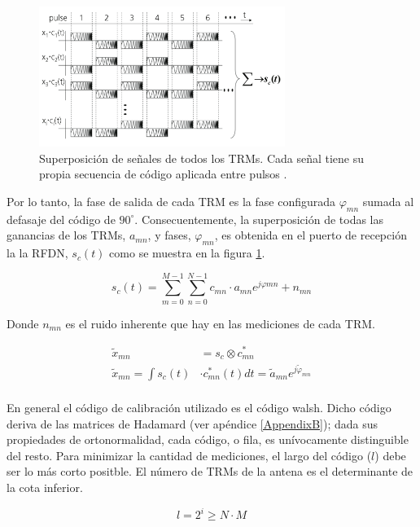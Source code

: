 \begin{figure}[!H]
 \centering
 \includegraphics[width=8cm]{gfx/superposition_signals_classic.png}
 \caption{Superposición de señales de todos los TRMs. Cada señal tiene su propia secuencia de código aplicada entre pulsos \cite{Br2007}.}
 \label{fig:sup_sign_classic}
\end{figure}

Por lo tanto, la fase de salida de cada TRM es la fase configurada $\varphi_{mn}$ sumada al defasaje del código de 
$90^{\circ}$. Consecuentemente, la superposición de todas las ganancias de los TRMs, $a_{mn}$, y fases, $\varphi_{mn}$,
es obtenida en el puerto de recepción la la RFDN, $s_c(t)$ como se muestra en la figura \ref{fig:sup_sign_classic}.

\begin{equation}
	s_c(t) = \sum_{m=0}^{M-1}\sum_{n=0}^{N-1}c_{mn}\cdot a_{mn}e^{j\varphi{mn}} + n_{mn}
\end{equation}

Donde $n_{mn}$ es el ruido inherente que hay en las mediciones de cada TRM.

\begin{equation}
\begin{aligned}
	\tilde{x}_{mn} &= s_c \otimes c^*_{mn} \\
	\tilde{x}_{mn} = \int s_c(t) &\cdot c^*_{mn}(t) dt = \tilde{a}_{mn}e^{j\tilde{\varphi}_{mn}} \\
\end{aligned}
\label{eq:con}
\end{equation}

En general el código de calibración utilizado es el código walsh. Dicho código deriva de las matrices de Hadamard (ver 
apéndice \ref{AppendixB}); dada sus propiedades de ortonormalidad, cada código, o fila, es unívocamente distinguible del 
resto. Para minimizar la cantidad de mediciones, el largo del código ($l$) debe ser lo más corto positble. El número de 
TRMs de la antena es el determinante de la cota inferior.

\begin{equation}
	l = 2^i \ge N \cdot M
\end{equation}

